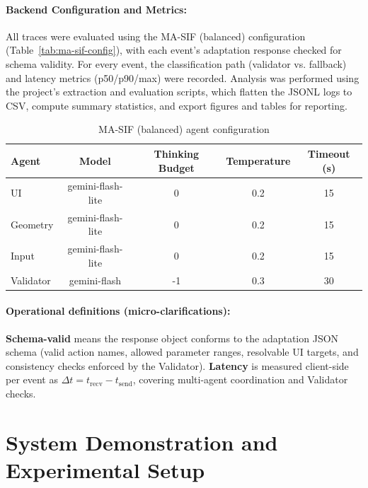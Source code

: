 \documentclass[openany]{book}
\begin{document}
\paragraph{Backend Configuration and Metrics:} 
All traces were evaluated using the MA-SIF (balanced) configuration (Table~\ref{tab:ma-sif-config}), with each event’s adaptation response checked for schema validity. For every event, the classification path (validator vs. fallback) and latency metrics (p50/p90/max) were recorded. Analysis was performed using the project’s extraction and evaluation scripts, which flatten the JSONL logs to CSV, compute summary statistics, and export figures and tables for reporting.
\begin{table}[htb]
\centering
\caption{MA-SIF (balanced) agent configuration}
\label{tab:ma-sif-config}
\begin{tabular}{lcccc}
\toprule
\textbf{Agent} & \textbf{Model} & \textbf{Thinking Budget} & \textbf{Temperature} & \textbf{Timeout (s)} \\
\midrule
UI         & gemini-flash-lite & 0   & 0.2 & 15 \\
Geometry   & gemini-flash-lite & 0   & 0.2 & 15 \\
Input      & gemini-flash-lite & 0   & 0.2 & 15 \\
Validator  & gemini-flash      & -1  & 0.3 & 30 \\
\bottomrule
\end{tabular}
\label{tab:ma-sif-config-eval}
\end{table}

\paragraph{Operational definitions (micro-clarifications):}
\textbf{Schema-valid} means the response object conforms to the adaptation JSON schema (valid action names, allowed parameter ranges, resolvable UI targets, and consistency checks enforced by the Validator). 
\textbf{Latency} is measured client-side per event as $\Delta t = t_{\text{recv}} - t_{\text{send}}$, covering multi-agent coordination and Validator checks.

\section{System Demonstration and Experimental Setup}
\end{document}
